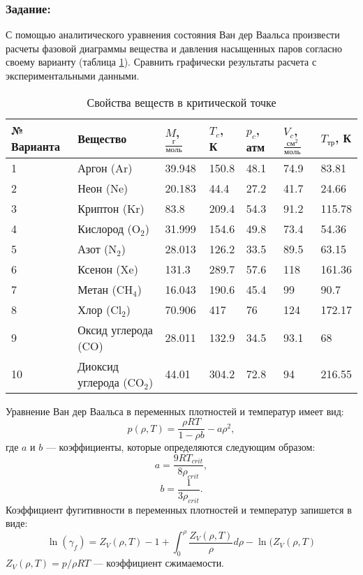 \subsubsection{Задание:}
С помощью аналитического уравнения состояния Ван дер Ваальса произвести расчеты фазовой диаграммы вещества и давления насыщенных паров согласно своему варианту (таблица \ref{tab:eos.task}). Сравнить графически результаты расчета с экспериментальными данными.
\begin{table}[h]
	\caption{Свойства веществ в критической точке}
	\label{tab:eos.task}
	\begin{tabularx}{\textwidth}%
		{|p{}
		|p{}
		|X
		|X
		|X
		|X
		|X|
		}
		\hline
		№ Варианта & Вещество  & $M$, $\frac{г}{моль}$  & $T_{c}$, К  & $p_{c}$, атм  & $V_{c}$, ${\frac{см^2}{моль}}$ & $T_{тр}$, К  \\ \hline \hline
		1 & Аргон (Ar)  & 39.948  & 150.8 & 48.1 & 74.9 & 83.81 \\ \hline
		2 & Неон (Ne) & 20.183 & 44.4 & 27.2 & 41.7 & 24.66 \\ \hline
		3 & Криптон (Kr) & 83.8 & 209.4 & 54.3 & 91.2 & 115.78 \\ \hline
		4 & Кислород ($\mathrm{O_2}$) & 31.999 & 154.6 & 49.8 & 73.4 & 54.36\\ \hline
		5 & Азот ($\mathrm{N_2}$) & 28.013 & 126.2 & 33.5 & 89.5 & 63.15 \\ \hline
		6 & Ксенон (Xe) & 131.3 & 289.7 & 57.6 & 118 & 161.36 \\ \hline
		7 & Метан ($\mathrm{CH_4}$) & 16.043 & 190.6 & 45.4 & 99 & 90.7 \\ \hline
		8 & Хлор ($\mathrm{Cl_2}$) & 70.906 & 417 & 76 & 124 & 172.17 \\ \hline
		9 & Оксид углерода (CO) & 28.011 & 132.9 & 34.5 & 93.1 & 68 \\ \hline
		10 & Диоксид углерода ($\mathrm{CO_2}$) &44.01 & 304.2 & 72.8 & 94 &	216.55 \\ \hline
	\end{tabularx}
\end{table}
	
	Уравнение Ван дер Ваальса в переменных плотностей и температур имеет вид:
	\begin{equation*}
		p(\rho,T)=\dfrac{\rho R T}{1-\rho b} - a \rho^2,
	\end{equation*}
	где $a$ и $b$ --- коэффициенты, которые определяются следующим образом:
	\begin{equation*}
		a=\dfrac{9 R T_{crit}}{8 \rho_{crit}},
	\end{equation*}
	\begin{equation*}
		b=\dfrac{1}{3 \rho_{crit}}.
	\end{equation*}
	Коэффициент фугитивности в переменных плотностей и температур запишется в виде:
	\begin{equation*}
		\ln(\gamma_f)=Z_V(\rho,T)-1+\int_{0}^{\rho} \dfrac{Z_V(\rho,T)}{\rho} d\rho -\ln(Z_V(\rho,T)
	\end{equation*}
	$Z_V(\rho,T)=p/{\rho R T}$ --- коэффициент сжимаемости.

